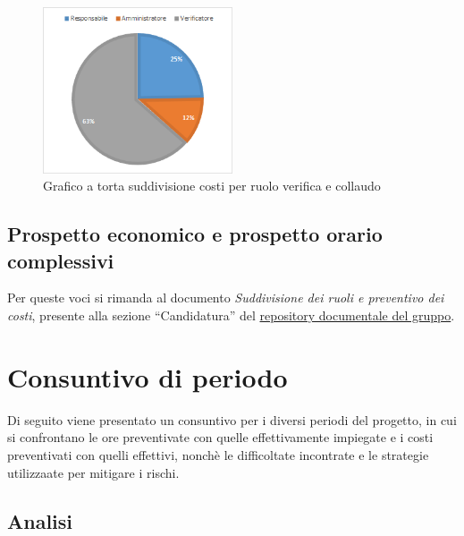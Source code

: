 \begin{figure}[H]
    \centering
    \includegraphics[width=0.5\textwidth]{images/torta_collaudo.png}
    \caption{Grafico a torta suddivisione costi per ruolo verifica e collaudo}
    \label{fig:torta_collaudo}
\end{figure}

\subsection{Prospetto economico e prospetto orario complessivi}\label{sec:preventivo:totale}
Per queste voci si rimanda al documento \textit{Suddivisione dei ruoli e preventivo dei  costi}, presente alla sezione ``Candidatura'' del \href{https://avant-garde-software-engineering.github.io/documentazione.html}{repository documentale del gruppo}.



\newpage
\section{Consuntivo di periodo}\label{sec:consuntivo}

Di seguito viene presentato un consuntivo per i diversi periodi del progetto, in cui si confrontano le ore preventivate con quelle effettivamente impiegate e i costi preventivati con quelli effettivi, nonchè le difficoltate incontrate e le strategie utilizzaate per mitigare i rischi.\\

\subsection{Analisi}\label{sec:consuntivo:analisi}

